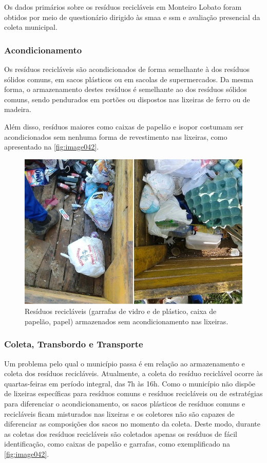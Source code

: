 	Os dados primários sobre os resíduos recicláveis em Monteiro Lobato foram obtidos por meio de questionário dirigido às \gls{smaa} e \gls{ssm} e avaliação presencial da coleta municipal.
	
	\subsubsection{Acondicionamento}
	
	Os resíduos recicláveis são acondicionados de forma semelhante à dos resíduos sólidos comuns, em sacos plásticos ou em sacolas de supermercados. Da mesma forma, o armazenamento destes resíduos é semelhante ao dos resíduos sólidos comuns, sendo pendurados em portões ou dispostos nas lixeiras de ferro ou de madeira.
	
	Além disso, resíduos maiores como caixas de papelão e isopor costumam ser acondicionados sem nenhuma forma de revestimento nas lixeiras, como apresentado na \autoref{fig:image042}.
	
	\begin{figure}
		\centering
		\includegraphics[width=0.7\linewidth]{produtos/prodtres/image041}
		\caption{Resíduos recicláveis (garrafas de vidro e de plástico, caixa de papelão, papel) armazenados sem acondicionamento nas lixeiras.}
		\label{fig:image041}
	\end{figure}
		
	\subsubsection{Coleta, Transbordo e Transporte}
	
	Um problema pelo qual o município passa é em relação ao armazenamento e coleta dos resíduos recicláveis. Atualmente, a coleta do resíduo reciclável ocorre às quartas-feiras em período integral, das 7h às 16h.
	Como o município não dispõe de lixeiras específicas para resíduos comuns e resíduos recicláveis ou de estratégias para diferenciar o acondicionamento, os sacos plásticos de resíduos comuns e recicláveis ficam misturados nas lixeiras e os coletores não são capazes de diferenciar as composições dos sacos no momento da coleta. Deste modo, durante as coletas dos resíduos recicláveis são coletados apenas os resíduos de fácil identificação, como caixas de papelão e garrafas, como exemplificado na \autoref{fig:image042}.
	
